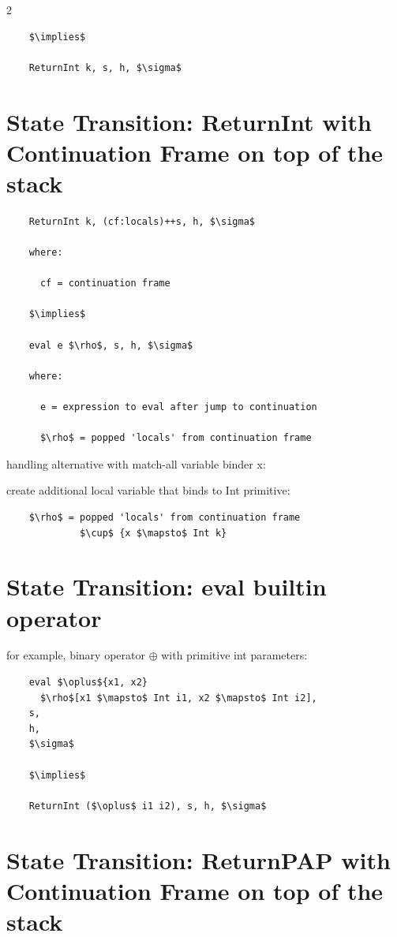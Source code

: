 \documentclass[8pt]{extarticle}
\begin{document}
\begin{multicols*}{2}
\begin{lstlisting}
    $\implies$

    ReturnInt k, s, h, $\sigma$
  \end{lstlisting}

  \vfill\null
  \columnbreak

  \section{State Transition: ReturnInt with Continuation Frame on top of the stack}

  \begin{lstlisting}
    ReturnInt k, (cf:locals)++s, h, $\sigma$

    where:

      cf = continuation frame

    $\implies$

    eval e $\rho$, s, h, $\sigma$

    where:

      e = expression to eval after jump to continuation

      $\rho$ = popped 'locals' from continuation frame
  \end{lstlisting}

  handling alternative with match-all variable binder x:

  create additional local variable that binds to Int primitive:
  \begin{lstlisting}
    $\rho$ = popped 'locals' from continuation frame
             $\cup$ {x $\mapsto$ Int k}
  \end{lstlisting}

  \section{State Transition: eval builtin operator}

  for example, binary operator $\oplus$ with primitive int parameters:

  \begin{lstlisting}
    eval $\oplus${x1, x2}
      $\rho$[x1 $\mapsto$ Int i1, x2 $\mapsto$ Int i2],
    s,
    h,
    $\sigma$

    $\implies$

    ReturnInt ($\oplus$ i1 i2), s, h, $\sigma$
  \end{lstlisting}


  \section{State Transition: ReturnPAP with Continuation Frame on top of the stack}


\end{multicols*}
\end{document}
